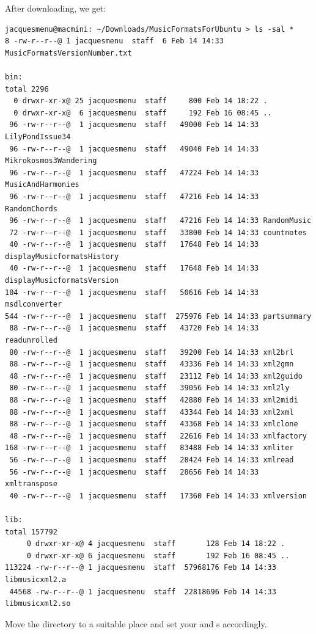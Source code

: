 After downloading, we get:
\begin{lstlisting}[language=Terminal]
jacquesmenu@macmini: ~/Downloads/MusicFormatsForUbuntu > ls -sal *
8 -rw-r--r--@ 1 jacquesmenu  staff  6 Feb 14 14:33 MusicFormatsVersionNumber.txt

bin:
total 2296
  0 drwxr-xr-x@ 25 jacquesmenu  staff     800 Feb 14 18:22 .
  0 drwxr-xr-x@  6 jacquesmenu  staff     192 Feb 16 08:45 ..
 96 -rw-r--r--@  1 jacquesmenu  staff   49000 Feb 14 14:33 LilyPondIssue34
 96 -rw-r--r--@  1 jacquesmenu  staff   49040 Feb 14 14:33 Mikrokosmos3Wandering
 96 -rw-r--r--@  1 jacquesmenu  staff   47224 Feb 14 14:33 MusicAndHarmonies
 96 -rw-r--r--@  1 jacquesmenu  staff   47216 Feb 14 14:33 RandomChords
 96 -rw-r--r--@  1 jacquesmenu  staff   47216 Feb 14 14:33 RandomMusic
 72 -rw-r--r--@  1 jacquesmenu  staff   33800 Feb 14 14:33 countnotes
 40 -rw-r--r--@  1 jacquesmenu  staff   17648 Feb 14 14:33 displayMusicformatsHistory
 40 -rw-r--r--@  1 jacquesmenu  staff   17648 Feb 14 14:33 displayMusicformatsVersion
104 -rw-r--r--@  1 jacquesmenu  staff   50616 Feb 14 14:33 msdlconverter
544 -rw-r--r--@  1 jacquesmenu  staff  275976 Feb 14 14:33 partsummary
 88 -rw-r--r--@  1 jacquesmenu  staff   43720 Feb 14 14:33 readunrolled
 80 -rw-r--r--@  1 jacquesmenu  staff   39200 Feb 14 14:33 xml2brl
 88 -rw-r--r--@  1 jacquesmenu  staff   43336 Feb 14 14:33 xml2gmn
 48 -rw-r--r--@  1 jacquesmenu  staff   23112 Feb 14 14:33 xml2guido
 80 -rw-r--r--@  1 jacquesmenu  staff   39056 Feb 14 14:33 xml2ly
 88 -rw-r--r--@  1 jacquesmenu  staff   42880 Feb 14 14:33 xml2midi
 88 -rw-r--r--@  1 jacquesmenu  staff   43344 Feb 14 14:33 xml2xml
 88 -rw-r--r--@  1 jacquesmenu  staff   43368 Feb 14 14:33 xmlclone
 48 -rw-r--r--@  1 jacquesmenu  staff   22616 Feb 14 14:33 xmlfactory
168 -rw-r--r--@  1 jacquesmenu  staff   83488 Feb 14 14:33 xmliter
 56 -rw-r--r--@  1 jacquesmenu  staff   28424 Feb 14 14:33 xmlread
 56 -rw-r--r--@  1 jacquesmenu  staff   28656 Feb 14 14:33 xmltranspose
 40 -rw-r--r--@  1 jacquesmenu  staff   17360 Feb 14 14:33 xmlversion

lib:
total 157792
     0 drwxr-xr-x@ 4 jacquesmenu  staff       128 Feb 14 18:22 .
     0 drwxr-xr-x@ 6 jacquesmenu  staff       192 Feb 16 08:45 ..
113224 -rw-r--r--@ 1 jacquesmenu  staff  57968176 Feb 14 14:33 libmusicxml2.a
 44568 -rw-r--r--@ 1 jacquesmenu  staff  22818696 Feb 14 14:33 libmusicxml2.so
\end{lstlisting}

Move the  directory to a suitable place and set your  and  \environmentVariable s accordingly.


